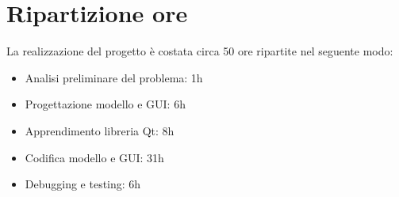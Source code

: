     \section*{Ripartizione ore}
        La realizzazione del progetto è costata circa 50 ore ripartite nel seguente modo:
        \begin{itemize}
            \item Analisi preliminare del problema: 1h
            \item Progettazione modello e GUI: 6h
            \item Apprendimento libreria Qt: 8h
            \item Codifica modello e GUI: 31h
            \item Debugging e testing: 6h
        \end{itemize}


    


